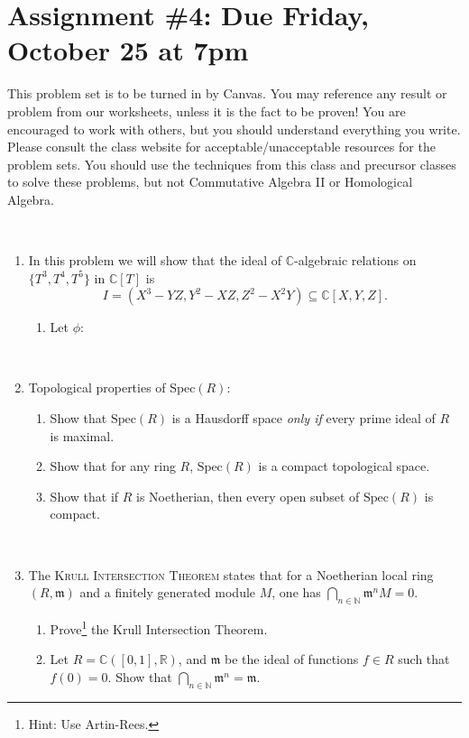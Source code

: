 \documentclass[12pt]{amsart}
\newcommand{\N}{\mathbb{N}}
\newcommand{\R}{\mathbb{R}}
\newcommand{\C}{\mathbb{C}}
\newcommand{\m}{\mathfrak{m}}
\newcommand{\Spec}{\mathrm{Spec}}
\newcommand{\showsol}[1]{\def\displaysol{#1}}
\begin{document}
\showsol{1}
	
	\thispagestyle{empty}
	
	\section*{Assignment \#4: Due Friday, October 25 at 7pm}
	
	This problem set is to be turned in by Canvas. You may reference any result or problem from our worksheets, unless it is the fact to be proven! You are encouraged to work with others, but you should understand everything you write. Please consult the class website for acceptable/unacceptable resources for the problem sets. You should use the techniques from this class and precursor classes to solve these problems, but not Commutative Algebra II or Homological Algebra.
	
	
	\
	
\begin{enumerate}

\item In this problem we will show that the ideal of $\C$-algebraic relations on $\{T^3,T^4,T^5\}$ in $\C[T]$ is
\[ I = ( X^3 - YZ, Y^2-XZ, Z^2-X^2Y) \subseteq \C[X,Y,Z].\]
\begin{enumerate}
\item Let $\phi:$
\end{enumerate}

\


\item Topological properties of $\Spec(R)$:
\begin{enumerate}
\item Show that $\Spec(R)$ is a Hausdorff space \emph{only if} every prime ideal of $R$ is maximal.
\item Show that for any ring $R$, $\Spec(R)$ is a compact topological space.
\item Show that if $R$ is Noetherian, then every open subset of $\Spec(R)$ is compact.
\end{enumerate}

\

\item The \textsc{Krull Intersection Theorem} states that for a Noetherian local ring $(R,\m)$ and a finitely generated module $M$, one has $\bigcap_{n\in\N} \m^{n} M = 0$.
\begin{enumerate}
\item Prove\footnote{Hint: Use Artin-Rees.} the Krull Intersection Theorem.
\item Let $R=\C([0,1],\R)$, and $\m$ be the ideal of functions $f\in R$ such that $f(0)=0$. Show that $\bigcap_{n\in \N} \m^n = \m$.
\end{enumerate}






\end{enumerate}
\end{document}
